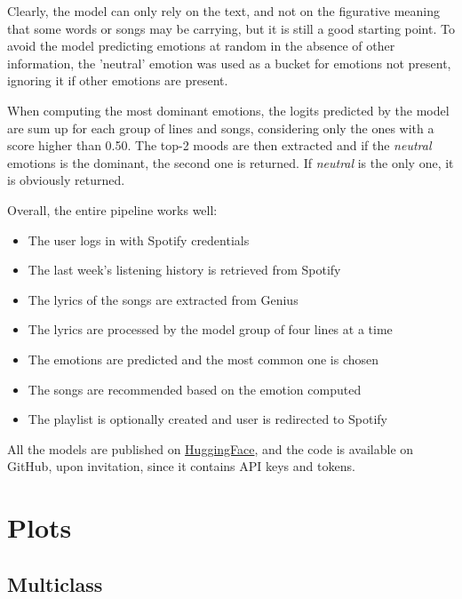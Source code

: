 \documentclass[11pt]{article}
\begin{document}
Clearly, the model can only rely on the text, and not on the figurative meaning that some words or songs may be carrying, but it is still a good starting point. To avoid the model predicting emotions at random in the absence of other information, the 'neutral' emotion was used as a bucket for emotions not present, ignoring it if other emotions are present.

When computing the most dominant emotions, the logits predicted by the model are sum up for each group of lines and songs, considering only the ones with a score higher than 0.50. The top-2 moods are then extracted and if the \textit{neutral} emotions is the dominant, the second one is returned. If \textit{neutral} is the only one, it is obviously returned.


Overall, the entire pipeline works well:

\begin{itemize}
  \setlength\itemsep{0.05em}
  \item The user logs in with Spotify credentials
  \item The last week's listening history is retrieved from Spotify
  \item The lyrics of the songs are extracted from Genius
  \item The lyrics are processed by the model group of four lines at a time
  \item The emotions are predicted and the most common one is chosen
  \item The songs are recommended based on the emotion computed
  \item The playlist is optionally created and user is redirected to Spotify
\end{itemize}

All the models are published on \href{https://huggingface.co/Franzin}{HuggingFace}, and the code is available on GitHub, upon invitation, since it contains API keys and tokens.

% 

\appendix

\clearpage

\section{Plots}
\label{sec:appendix}

\subsection{Multiclass}
\end{document}
